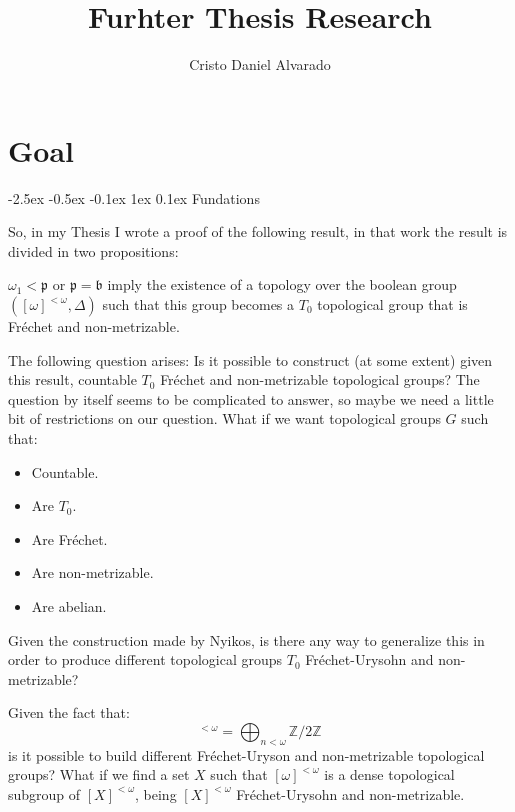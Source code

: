 \documentclass[12pt]{report}
\makeatletter
\renewcommand{\section}{\@startsection{section}{1}{\z@}%
  {-2.5ex \@plus -0.5ex \@minus -0.1ex}%
  {1ex \@plus 0.1ex}%
  {\normalfont\Large\sectionstyle}}
\newcommand{\sectionstyle}[1]{%
  \par\noindent\hrule
  \vspace{0.2ex}%
  {\scshape{#1}\par}%
  \vspace{0.4ex}%
  \hrule
}
\theoremstyle{largebreak}
\makeatother
\begin{document}
    \setlength{\parskip}{5pt}
    \setlength{\parindent}{12pt}
    \title{Furhter Thesis Research}
    \author{Cristo Daniel Alvarado}
    \maketitle

    \tableofcontents

    \lstlistoflistings

    \newpage

    \chapter{Goal}

    \section{Fundations}

    So, in my Thesis I wrote a proof of the following result, in that work the result is divided in two propositions:

    \begin{theor}
        $\omega_1<\mathfrak{p}$ or $\mathfrak{p}=\mathfrak{b}$ imply the existence of a topology over the boolean group $([\omega]^{<\omega},\Delta)$ such that this group becomes a $T_0$ topological group that is Fréchet and non-metrizable.
    \end{theor}

    The following question arises: Is it possible to construct (at some extent) given this result, countable $T_0$ Fréchet and non-metrizable topological groups? The question by itself seems to be complicated to answer, so maybe we need a little bit of restrictions on our question. What if we want topological groups $G$ such that:
    \begin{itemize}
        \item Countable.
        \item Are $T_0$.
        \item Are Fréchet.
        \item Are non-metrizable.
        \item Are abelian.
    \end{itemize}
    Given the construction made by Nyikos, is there any way to generalize this in order to produce different topological groups $T_0$ Fréchet-Urysohn and non-metrizable?

    \begin{obs}
        Given the fact that:
        \begin{equation*}
            [\omega]^{<\omega}=\bigoplus_{ n<\omega}\mathbb{Z}/2\mathbb{Z}
        \end{equation*}
        is it possible to build different Fréchet-Uryson and non-metrizable topological groups? What if we find a set $X$ such that $[\omega]^{<\omega}$ is a dense topological subgroup of $[X]^{<\omega}$, being $[X]^{<\omega}$ Fréchet-Urysohn and non-metrizable.
    \end{obs}
\end{document}
